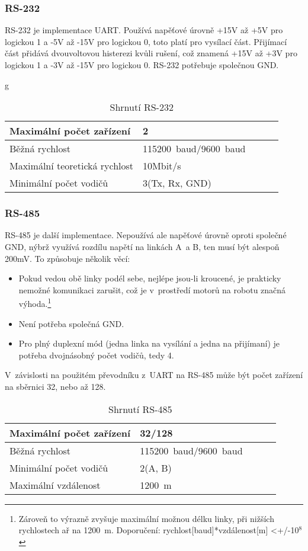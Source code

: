 \documentclass[12pt]{article}
\begin{document}
   \subsubsection{RS-232} %
   RS-232 je implementace UART.
   Používá napěťové úrovně +15V až +5V pro logickou 1 a -5V až -15V pro logickou 0, toto platí pro vysílací část.
   Přijímací část přidává dvouvoltovou histerezi kvůli rušení, což znamená +15V až +3V pro logickou 1 a -3V až -15V pro logickou 0.
   RS-232 potřebuje společnou GND.
   \begin{table}[h]g
   	
   	\centering
   	\begin{tabular}{|l|l|l|l|l|} \hline
   		Maximální počet zařízení      & 2              \\ \hline
   		Běžná rychlost                & 115200~baud/9600~baud        \\ \hline
   		Maximální teoretická rychlost & 10Mbit/s       \\ \hline
   		Minimální počet vodičů        & 3(Tx, Rx, GND) \\ \hline
   	\end{tabular}
   	\caption{Shrnutí RS-232}
   \end{table}
   \subsubsection{RS-485} %
   RS-485 je další implementace.
   Nepoužívá ale napěťové úrovně oproti společné GND, nýbrž využívá rozdílu napětí na linkách A~a B, ten musí být alespoň 200mV.
   To způsobuje několik věcí:
   \begin{itemize}
   	\item Pokud vedou obě linky podél sebe, nejlépe jsou-li kroucené, je prakticky nemožné komunikaci zarušit, což je v~prostředí motorů na robotu značná výhoda.\footnote{Zároveň to výrazně zvyšuje maximální možnou délku linky, při nižších rychlostech ař na 1200~m. Doporučení: rychlost[baud]*vzdálenost[m] <+/-10$^{8}$}   
   	\item Není potřeba společná GND.
   	\item Pro plný duplexní mód (jedna linka na vysílání a jedna na přijímaní) je potřeba dvojnásobný počet vodičů, tedy 4.
   \end{itemize}
   V~závislosti na použitém převodníku z~UART na RS-485 může být počet zařízení na sběrnici 32, nebo až 128.
 
   \begin{table}[h]
   	
   	\centering
   	\begin{tabular}{|l|l|l|l|l|} \hline
   		Maximální počet zařízení      & 32/128              \\ \hline
   		Běžná rychlost                & 115200~baud/9600~baud        \\ \hline
   		Minimální počet vodičů        & 2(A, B) \\ \hline
   		Maximální vzdálenost		  & 1200~m \\ \hline
   	\end{tabular}
   	\caption{Shrnutí RS-485}
   \end{table}
   
\end{document}

